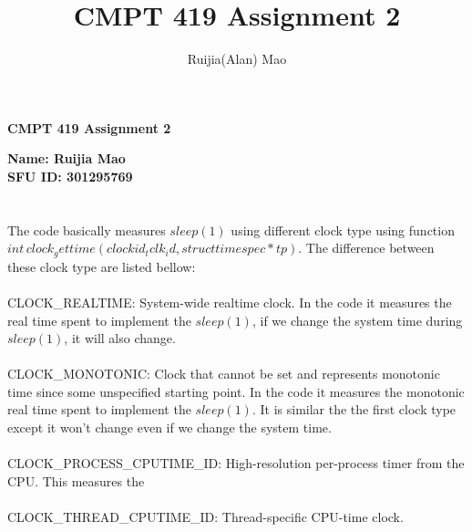 \documentclass[a4paper,openany,10.5pt]{article}
\title{CMPT 419 Assignment 2}
\author{Ruijia(Alan) Mao}
\begin{document}
	\begin{center}
		\textbf{CMPT 419 Assignment 2 }
	\end{center}
	
	\begin{flushright}
		\textbf{Name: Ruijia Mao }\\
		\textbf{SFU ID: 301295769}
	\end{flushright}
	
	\section{ }
	The code basically measures $sleep(1)$ using different clock type using function $int\,clock_gettime(clockid_t clk_id, struct 	timespec *tp)$. The difference between these clock type are listed bellow:
	\\ \\
	CLOCK\_REALTIME: System-wide realtime clock. In the code it measures the real time spent to implement the $sleep(1)$, if we change the system time during $sleep(1)$, it will also change.
	\\ \\
	CLOCK\_MONOTONIC: Clock that cannot be set and represents monotonic time since some unspecified starting point. In the code it measures the monotonic real time spent to implement the $sleep(1)$. It is similar the the first clock type except it won't change even if we change the system time.
	\\ \\
	CLOCK\_PROCESS\_CPUTIME\_ID: High-resolution per-process timer from the CPU. This measures the 
	\\ \\
	CLOCK\_THREAD\_CPUTIME\_ID: Thread-specific CPU-time clock.
	\\ \\
	
			
\end{document}
